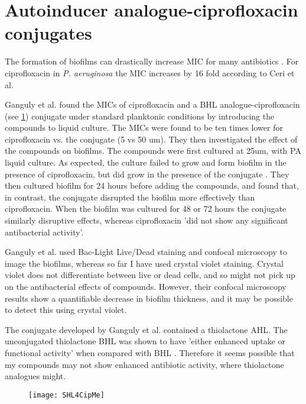 \section{Autoinducer analogue-ciprofloxacin conjugates}

The formation of biofilms can drastically increase MIC for many antibiotics \cite{Ceri1999}. For ciprofloxacin in \textit{P. aeruginosa} the MIC increases by 16 fold according to Ceri et al. 

Ganguly et al. \cite{Ganguly2011} found the MICs of ciprofloxacin and a BHL analogue-ciprofloxacin  (see \ref{fig:SHL4CipMe}) conjugate under standard planktonic conditions by introducing the compounds to liquid culture. The MICs were found to be ten times lower for ciprofloxacin vs. the conjugate  (5 vs 50 um). They then investigated the effect of the compounds on biofilms. The compounds were first cultured at 25um, with PA liquid culture. As expected, the culture failed to grow and form biofilm in the presence of ciprofloxacin, but did grow in the presence of the conjugate . They then cultured biofilm for 24 hours before adding the compounds, and found that, in contrast, the conjugate  disrupted the biofilm more effectively than ciprofloxacin. When the biofilm was cultured for 48 or 72 hours the conjugate similarly disruptive effects, whereas ciprofloxacin 'did not show any significant antibacterial activity'.

Ganguly et al. used Bac-Light Live/Dead staining and confocal microscopy to image the biofilms, whereas so far I have used crystal violet staining. Crystal violet does not differentiate between live or dead cells, and so might not pick up on the antibacterial effects of compounds. However, their confocal microscopy results show a quantifiable decrease in biofilm thickness, and it may be possible to detect this using crystal violet.

The conjugate  developed by Ganguly et al. contained a thiolactone AHL. The unconjugated thiolactone BHL  was shown to have 'either enhanced uptake or functional activity' when compared with BHL . Therefore it seems possible that my compounds may not show enhanced antibiotic activity, where thiolactone analogues might.


\begin{figure}[H]
	\begin{center}
		\texttt{[image: SHL4CipMe]}
		\caption{\label{fig:SHL4CipMe}}
	\end{center}
\end{figure}

